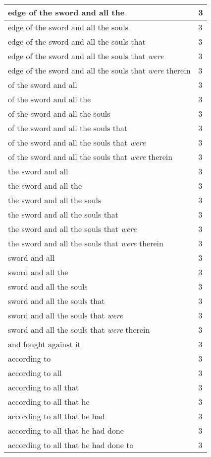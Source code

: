 \begin{center}
\begin{longtable}{|p{3.0in}|p{0.5in}|}
edge of the sword and all the & 3\\ \hline 
edge of the sword and all the souls & 3\\ \hline 
edge of the sword and all the souls that & 3\\ \hline 
edge of the sword and all the souls that \emph{were} & 3\\ \hline 
edge of the sword and all the souls that \emph{were} therein & 3\\ \hline 
of the sword and all & 3\\ \hline 
of the sword and all the & 3\\ \hline 
of the sword and all the souls & 3\\ \hline 
of the sword and all the souls that & 3\\ \hline 
of the sword and all the souls that \emph{were} & 3\\ \hline 
of the sword and all the souls that \emph{were} therein & 3\\ \hline 
the sword and all & 3\\ \hline 
the sword and all the & 3\\ \hline 
the sword and all the souls & 3\\ \hline 
the sword and all the souls that & 3\\ \hline 
the sword and all the souls that \emph{were} & 3\\ \hline 
the sword and all the souls that \emph{were} therein & 3\\ \hline 
sword and all & 3\\ \hline 
sword and all the & 3\\ \hline 
sword and all the souls & 3\\ \hline 
sword and all the souls that & 3\\ \hline 
sword and all the souls that \emph{were} & 3\\ \hline 
sword and all the souls that \emph{were} therein & 3\\ \hline 
and fought against it & 3\\ \hline 
according to & 3\\ \hline 
according to all & 3\\ \hline 
according to all that & 3\\ \hline 
according to all that he & 3\\ \hline 
according to all that he had & 3\\ \hline 
according to all that he had done & 3\\ \hline 
according to all that he had done to & 3\\ \hline 

\end{longtable}
\end{center}
